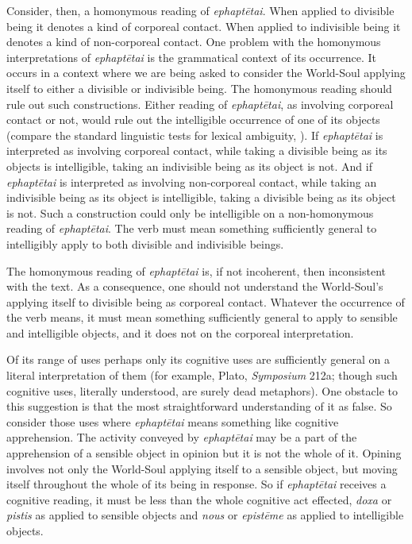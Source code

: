 Consider, then, a homonymous reading of \emph{ephaptētai}. When applied to divisible being it denotes a kind of corporeal contact. When applied to indivisible being it denotes a kind of non-corporeal contact. One problem with the homonymous interpretations of \emph{ephaptētai} is the grammatical context of its occurrence. It occurs in a context where we are being asked to consider the World-Soul applying itself to either a divisible or indivisible being. The homonymous reading should rule out such constructions. Either reading of \emph{ephaptētai}, as involving corporeal contact or not, would rule out the intelligible occurrence of one of its objects  (compare the standard linguistic tests for lexical ambiguity, \citealt{Zwicky:1975hl}). If \emph{ephaptētai} is interpreted as involving corporeal contact, while taking a divisible being as its objects is intelligible, taking an indivisible being as its object is not. And if \emph{ephaptētai} is interpreted as involving non-corporeal contact, while taking an indivisible being as its object is intelligible, taking a divisible being as its object is not. Such a construction could only be intelligible on a non-homonymous reading of \emph{ephaptētai}. The verb must mean something sufficiently general to intelligibly apply to both divisible and indivisible beings.

The homonymous reading of \emph{ephaptētai} is, if not incoherent, then inconsistent with the text. As a consequence, one should not understand the World-Soul's applying itself to divisible being as corporeal contact. Whatever the occurrence of the verb means, it must mean something sufficiently general to apply to sensible and intelligible objects, and it does not on the corporeal interpretation. 

Of its range of uses perhaps only its cognitive uses are sufficiently general on a literal interpretation of them (for example, Plato, \emph{Symposium} 212a; though such cognitive uses, literally understood, are surely dead metaphors). One obstacle to this suggestion is that the most straightforward understanding of it as false. So consider those uses where \emph{ephaptētai} means something like cognitive apprehension. The activity conveyed by \emph{ephaptētai} may be a part of the apprehension of a sensible object in opinion but it is not the whole of it. Opining involves not only the World-Soul applying itself to a sensible object, but moving itself throughout the whole of its being in response. So if \emph{ephaptētai} receives a cognitive reading, it must be less than the whole cognitive act effected, \emph{doxa} or \emph{pistis} as applied to sensible objects and \emph{nous} or \emph{epistēme} as applied to intelligible objects. 

